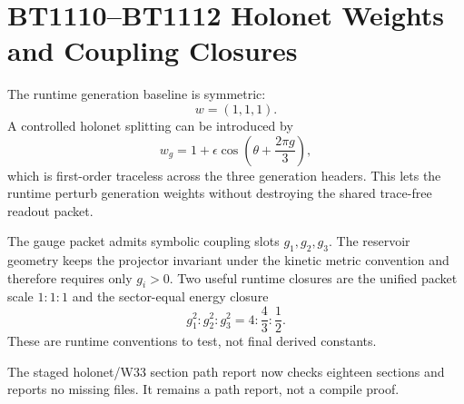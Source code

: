 \section{BT1110--BT1112 Holonet Weights and Coupling Closures}
\label{sec:bt1110-bt1112-holonet-weight-closure-report}

The runtime generation baseline is symmetric:
\[
w=(1,1,1).
\]
A controlled holonet splitting can be introduced by
\[
w_g=1+\epsilon\cos\left(\theta+\frac{2\pi g}{3}\right),
\]
which is first-order traceless across the three generation headers.  This lets the runtime perturb generation weights without destroying the shared trace-free readout packet.

The gauge packet admits symbolic coupling slots $g_1,g_2,g_3$.  The reservoir geometry keeps the projector invariant under the kinetic metric convention and therefore requires only $g_i>0$.  Two useful runtime closures are the unified packet scale $1:1:1$ and the sector-equal energy closure
\[
g_1^2:g_2^2:g_3^2=4:\frac43:\frac12.
\]
These are runtime conventions to test, not final derived constants.

The staged holonet/W33 section path report now checks eighteen sections and reports no missing files.  It remains a path report, not a compile proof.
